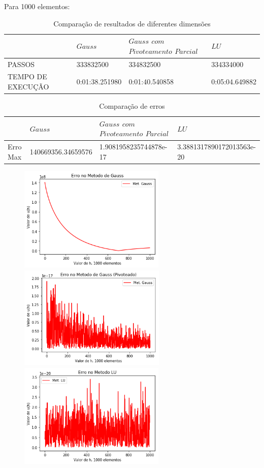 \documentclass{article}
\begin{document}
\newpage
Para 1000 elementos:

\begin{table}[h]
\centering
  \begin{tabular}{l||l|l|l}
     & $ Gauss$ & $Gauss$ $com$ $Pivoteamento$ $Parcial$ & $LU$ \\
    \hline
    
    PASSOS & 333832500 & 334832500 & 334334000\\
    
    TEMPO DE EXECUÇÃO &  0:01:38.251980 & 0:01:40.540858 & 0:05:04.649882\\
    
    \hline
  \end{tabular}
  \caption{Comparação de resultados de diferentes dimensões}
\end{table}

\begin{table}[h]
\centering
  \begin{tabular}{l||l|l|l}
     & $ Gauss$ & $Gauss$ $com$ $Pivoteamento$ $Parcial$ & $LU$ \\
    \hline
    
    Erro Max & 140669356.34659576 & 1.9081958235744878e-17 & 3.3881317890172013563e-20\\
    
    
    \hline
  \end{tabular}
  \caption{Comparação de erros}
\end{table}

\begin{figure}[!htb]
\includegraphics[width=7cm,height=5cm]{EGauss1000part.png}
\includegraphics [width=7cm,height=5cm]{EGaussP1000part.png}
\includegraphics [width=7cm,height=5cm]{ELU1000part.png}
\end{figure}
\end{document}
